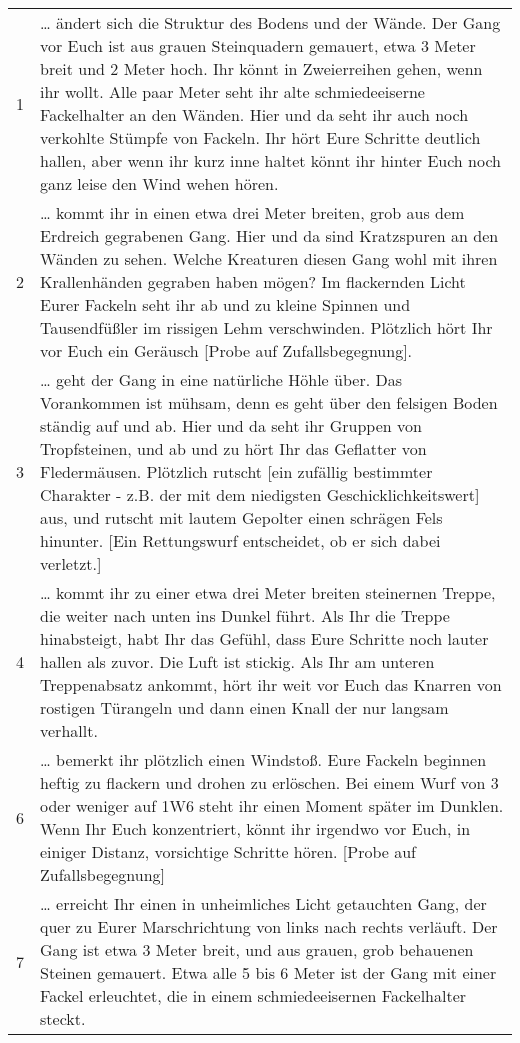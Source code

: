 \begin{tabularx}{\columnwidth}{cZ}
1  & \ldots{} ändert sich die Struktur des Bodens und der Wände. Der Gang
  vor Euch ist aus grauen Steinquadern gemauert, etwa 3 Meter breit und
  2 Meter hoch. Ihr könnt in Zweierreihen gehen, wenn ihr wollt. Alle
  paar Meter seht ihr alte schmiedeeiserne Fackelhalter an den Wänden.
  Hier und da seht ihr auch noch verkohlte Stümpfe von Fackeln. Ihr hört
  Eure Schritte deutlich hallen, aber wenn ihr kurz inne haltet könnt
  ihr hinter Euch noch ganz leise den Wind wehen hören.
\\
2 & \ldots{} kommt ihr in einen etwa drei Meter breiten, grob aus dem
  Erdreich gegrabenen Gang. Hier und da sind Kratzspuren an den Wänden
  zu sehen. Welche Kreaturen diesen Gang wohl mit ihren Krallenhänden
  gegraben haben mögen? Im flackernden Licht Eurer Fackeln seht ihr ab
  und zu kleine Spinnen und Tausendfüßler im rissigen Lehm verschwinden.
  Plötzlich hört Ihr vor Euch ein Geräusch [Probe auf
  Zufallsbegegnung].
\\
3 & \ldots{} geht der Gang in eine natürliche Höhle über. Das Vorankommen
  ist mühsam, denn es geht über den felsigen Boden ständig auf und ab.
  Hier und da seht ihr Gruppen von Tropfsteinen, und ab und zu hört Ihr
  das Geflatter von Fledermäusen. Plötzlich rutscht [ein zufällig
  bestimmter Charakter - z.B. der mit dem niedigsten
  Geschicklichkeitswert] aus, und rutscht mit lautem Gepolter einen
  schrägen Fels hinunter. [Ein Rettungswurf entscheidet, ob er sich dabei
  verletzt.]
\\
4 & \ldots{} kommt ihr zu einer etwa drei Meter breiten steinernen Treppe,
  die weiter nach unten ins Dunkel führt. Als Ihr die Treppe
  hinabsteigt, habt Ihr das Gefühl, dass Eure Schritte noch lauter
  hallen als zuvor. Die Luft ist stickig. Als Ihr am unteren
  Treppenabsatz ankommt, hört ihr weit vor Euch das Knarren von rostigen
  Türangeln und dann einen Knall der nur langsam verhallt.
\\
6 & \ldots{} bemerkt ihr plötzlich einen Windstoß. Eure Fackeln beginnen
  heftig zu flackern und drohen zu erlöschen. Bei einem Wurf von 3 oder
  weniger auf 1W6 steht ihr einen Moment später im Dunklen. Wenn Ihr
  Euch konzentriert, könnt ihr irgendwo vor Euch, in einiger Distanz,
  vorsichtige Schritte hören. [Probe auf Zufallsbegegnung]\\
7 & \ldots{} erreicht Ihr einen in unheimliches Licht getauchten Gang, der
  quer zu Eurer Marschrichtung von links nach rechts verläuft. Der Gang
  ist etwa 3 Meter breit, und aus grauen, grob behauenen Steinen
  gemauert. Etwa alle 5 bis 6 Meter ist der Gang mit einer Fackel
  erleuchtet, die in einem schmiedeeisernen Fackelhalter steckt.
  \\
\end{tabularx}
